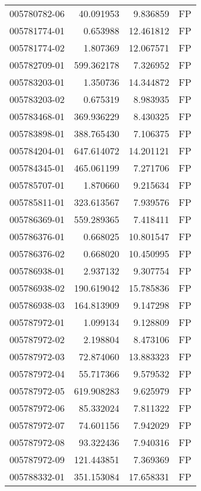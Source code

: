 \begin{tabular}{lrrl}
005780782-06 &   40.091953 &       9.836859 &   FP \\
005781774-01 &    0.653988 &      12.461812 &   FP \\
005781774-02 &    1.807369 &      12.067571 &   FP \\
005782709-01 &  599.362178 &       7.326952 &   FP \\
005783203-01 &    1.350736 &      14.344872 &   FP \\
005783203-02 &    0.675319 &       8.983935 &   FP \\
005783468-01 &  369.936229 &       8.430325 &   FP \\
005783898-01 &  388.765430 &       7.106375 &   FP \\
005784204-01 &  647.614072 &      14.201121 &   FP \\
005784345-01 &  465.061199 &       7.271706 &   FP \\
005785707-01 &    1.870660 &       9.215634 &   FP \\
005785811-01 &  323.613567 &       7.939576 &   FP \\
005786369-01 &  559.289365 &       7.418411 &   FP \\
005786376-01 &    0.668025 &      10.801547 &   FP \\
005786376-02 &    0.668020 &      10.450995 &   FP \\
005786938-01 &    2.937132 &       9.307754 &   FP \\
005786938-02 &  190.619042 &      15.785836 &   FP \\
005786938-03 &  164.813909 &       9.147298 &   FP \\
005787972-01 &    1.099134 &       9.128809 &   FP \\
005787972-02 &    2.198804 &       8.473106 &   FP \\
005787972-03 &   72.874060 &      13.883323 &   FP \\
005787972-04 &   55.717366 &       9.579532 &   FP \\
005787972-05 &  619.908283 &       9.625979 &   FP \\
005787972-06 &   85.332024 &       7.811322 &   FP \\
005787972-07 &   74.601156 &       7.942029 &   FP \\
005787972-08 &   93.322436 &       7.940316 &   FP \\
005787972-09 &  121.443851 &       7.369369 &   FP \\
005788332-01 &  351.153084 &      17.658331 &   FP \\

\end{tabular}
